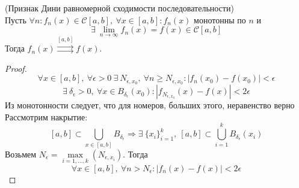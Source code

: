 \begin{theorem} (Признак Дини равномерной сходимости последовательности)\\
    Пусть $\forall n: f_n(x)\in \mathcal{C}[a,b],\ \forall x\in [a,b]: f_n(x)$ монотонны по $n$ и
    \[\exists\ \lim\limits_{n\to\infty}f_n(x)=f(x)\in \mathcal{C}[a,b]\]
    Тогда $f_n(x)\overset{[a,b]}{\rightrightarrows}f(x)$.
\end{theorem}
\begin{proof}
    \[\forall x\in [a,b],\ \forall \epsilon>0\ \exists\ N_{\epsilon,x_0},\ \forall n\geq N_{\epsilon, x_0}: |f_n(x_0)-f(x_0)|<\epsilon\]
    \[\exists\ \delta_{\epsilon}>0,\ \forall x\in B_{\delta_{\epsilon}}(x_0): |f_{N_{\epsilon,x_0}}(x)-f(x)|<2\epsilon\]
    Из монотонности следует, что для номеров, больших этого, неравенство верно
    Рассмотрим накрытие: %
    \[[a,b]\subset \bigcup\limits_{x\in [a,b]}B_{\delta_{\epsilon}} \Rightarrow \exists\ \{x_i\}_{i=1}^k,\ [a,b]\subset \bigcup\limits_{i=1}^k B_{\delta_{\epsilon}}(x_i)\]
    Возьмем $N_{\epsilon}=\max\limits_{i=1,\dots,k}(N_{\epsilon,x_i})$. Тогда
    \[\forall x\in [a,b],\ \forall n>N_{\epsilon}: |f_n(x)-f(x)|<2\epsilon\]
\end{proof}